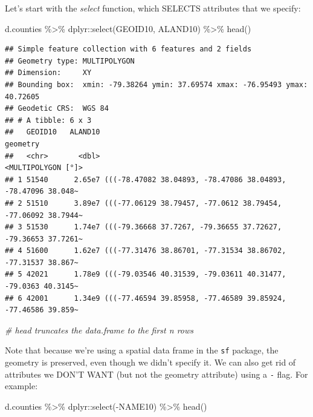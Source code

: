 \documentclass[]{article}
\newenvironment{Shaded}{\begin{snugshade}}{\end{snugshade}}
\newcommand{\CommentTok}[1]{\textcolor[rgb]{0.56,0.35,0.01}{\textit{#1}}}
\newcommand{\FunctionTok}[1]{\textcolor[rgb]{0.00,0.00,0.00}{#1}}
\newcommand{\NormalTok}[1]{#1}
\newcommand{\SpecialCharTok}[1]{\textcolor[rgb]{0.00,0.00,0.00}{#1}}
\begin{document}
Let's start with the \emph{select} function, which SELECTS attributes
that we specify:

\begin{Shaded}
\begin{Highlighting}[]
\NormalTok{d.counties }\SpecialCharTok{\%\textgreater{}\%}\NormalTok{ dplyr}\SpecialCharTok{::}\FunctionTok{select}\NormalTok{(GEOID10, ALAND10) }\SpecialCharTok{\%\textgreater{}\%} \FunctionTok{head}\NormalTok{()}
\end{Highlighting}
\end{Shaded}

\begin{verbatim}
## Simple feature collection with 6 features and 2 fields
## Geometry type: MULTIPOLYGON
## Dimension:     XY
## Bounding box:  xmin: -79.38264 ymin: 37.69574 xmax: -76.95493 ymax: 40.72605
## Geodetic CRS:  WGS 84
## # A tibble: 6 x 3
##   GEOID10   ALAND10                                                     geometry
##   <chr>       <dbl>                                           <MULTIPOLYGON [°]>
## 1 51540      2.65e7 (((-78.47082 38.04893, -78.47086 38.04893, -78.47096 38.048~
## 2 51510      3.89e7 (((-77.06129 38.79457, -77.0612 38.79454, -77.06092 38.7944~
## 3 51530      1.74e7 (((-79.36668 37.7267, -79.36655 37.72627, -79.36653 37.7261~
## 4 51600      1.62e7 (((-77.31476 38.86701, -77.31534 38.86702, -77.31537 38.867~
## 5 42021      1.78e9 (((-79.03546 40.31539, -79.03611 40.31477, -79.0363 40.3145~
## 6 42001      1.34e9 (((-77.46594 39.85958, -77.46589 39.85924, -77.46586 39.859~
\end{verbatim}

\begin{Shaded}
\begin{Highlighting}[]
\CommentTok{\# head truncates the data.frame to the first n rows}
\end{Highlighting}
\end{Shaded}

Note that because we're using a spatial data frame in the \texttt{sf}
package, the geometry is preserved, even though we didn't specify it. We
can also get rid of attributes we DON'T WANT (but not the geometry
attribute) using a \texttt{-} flag. For example:

\begin{Shaded}
\begin{Highlighting}[]
\NormalTok{d.counties }\SpecialCharTok{\%\textgreater{}\%}\NormalTok{ dplyr}\SpecialCharTok{::}\FunctionTok{select}\NormalTok{(}\SpecialCharTok{{-}}\NormalTok{NAME10) }\SpecialCharTok{\%\textgreater{}\%} \FunctionTok{head}\NormalTok{()}
\end{Highlighting}
\end{Shaded}
\end{document}
